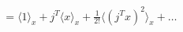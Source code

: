 \documentclass[preview]{standalone}
\begin{document}
\begin{align*}
= \langle 1 \rangle_x + j^T \langle x \rangle_x + \frac{1}{2!} \langle (j^T x)^2 \rangle_x + \dots
\end{align*}
\end{document}
